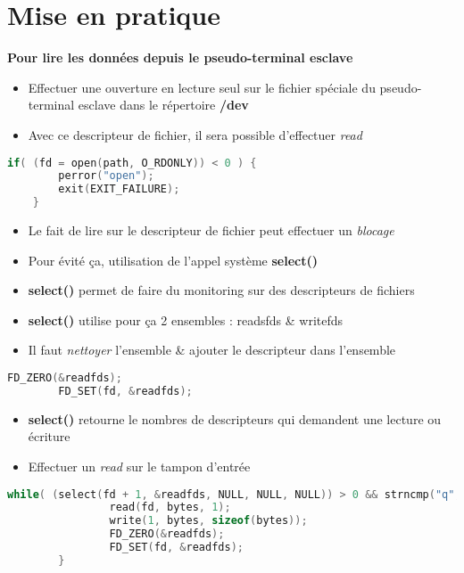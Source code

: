 \section{Mise en pratique}

\begin{frame}[fragile]
	\textbf{Pour lire les données depuis le pseudo-terminal esclave}
	\begin{itemize}
		\item Effectuer une ouverture en lecture seul sur le fichier spéciale du pseudo-terminal esclave dans le répertoire \textbf{/dev}
		\item Avec ce descripteur de fichier, il sera possible d'effectuer \textit{read}
	\end{itemize}

	\begin{lstlisting}[language=C]
	if( (fd = open(path, O_RDONLY)) < 0 ) {
		perror("open");
		exit(EXIT_FAILURE);
	}
	\end{lstlisting}
\end{frame}

\begin{frame}[fragile]

	\begin{itemize}
		\item Le fait de lire sur le descripteur de fichier peut effectuer un \textit{blocage}
		\item Pour évité ça, utilisation de l'appel système \textbf{select()}
		\item \textbf{select()} permet de faire du monitoring sur des descripteurs de fichiers
		\item \textbf{select()} utilise pour ça 2 ensembles : readsfds \& writefds
		\item Il faut \textit{nettoyer} l'ensemble \& ajouter le descripteur dans l'ensemble
	\end{itemize}

	\begin{lstlisting}[language=C]
        FD_ZERO(&readfds);
        FD_SET(fd, &readfds);
        \end{lstlisting}
\end{frame}

\begin{frame}[fragile]

	\begin{itemize}
		\item \textbf{select()} retourne le nombres de descripteurs qui demandent une lecture ou écriture
		\item Effectuer un \textit{read} sur le tampon d'entrée
	\end{itemize}

	\begin{lstlisting}[language=C]
	while( (select(fd + 1, &readfds, NULL, NULL, NULL)) > 0 && strncmp("q", bytes, 1) != 0) {
                read(fd, bytes, 1);
                write(1, bytes, sizeof(bytes));
                FD_ZERO(&readfds);
                FD_SET(fd, &readfds);
        }
	\end{lstlisting}

\end{frame}

